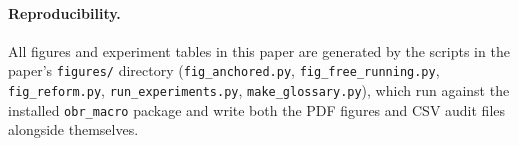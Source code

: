 \paragraph{Reproducibility.} All figures and experiment tables in this paper are generated by the scripts in the paper's \texttt{figures/} directory (\texttt{fig\_anchored.py}, \texttt{fig\_free\_running.py}, \texttt{fig\_reform.py}, \texttt{run\_experiments.py}, \texttt{make\_glossary.py}), which run against the installed \texttt{obr\_macro} package and write both the PDF figures and CSV audit files alongside themselves.
